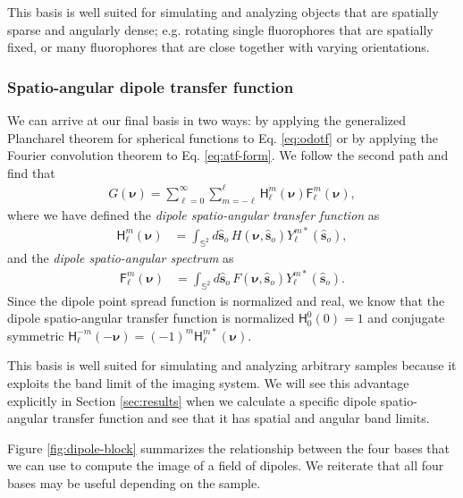 \documentclass[]{osa-article}
\providecommand{\msf}[1]{\mathsf{#1}}
\providecommand{\so}{\mathbf{\hat{s}}_o}
\providecommand{\mbb}[1]{\mathbb{#1}}
\providecommand{\bs}[1]{\boldsymbol{#1}}
\providecommand{\bv}{\bs{\nu}}
\providecommand{\lmsum}{\sum_{\ell=0}^\infty\sum_{m=-\ell}^{\ell}}
\begin{document}
This basis is well suited for simulating and analyzing objects that are
spatially sparse and angularly dense; e.g. rotating single fluorophores that are
spatially fixed, or many fluorophores that are close together with varying
orientations.

\subsubsection{Spatio-angular dipole transfer function}
We can arrive at our final basis in two ways: by applying the generalized
Plancharel theorem for spherical functions to Eq. \ref{eq:odotf} or by applying
the Fourier convolution theorem to Eq. \ref{eq:atf-form}. We follow the
second path and find that
\begin{align}
G(\bv) = \lmsum \msf{H}_\ell^m(\bv)\msf{F}_\ell^m(\bv) \label{eq:saft},
\end{align}
where we have defined the \textit{dipole spatio-angular transfer function} as
  \begin{align}
  \msf{H}_\ell^m(\bv) &= \int_{\mbb{S}^2}d\so\, H(\bv, \so)Y_\ell^{m*}(\so),
  \end{align}
  and the \textit{dipole spatio-angular spectrum} as
  \begin{align}
  \msf{F}_\ell^m(\bv) &= \int_{\mbb{S}^2}d\so\, F(\bv, \so)Y_\ell^{m*}(\so).
  \end{align}
  Since the dipole point spread function is normalized and real, we know
  that the dipole spatio-angular transfer function is normalized
  $\msf{H}_0^0(0) = 1$ and conjugate symmetric
  $\msf{H}_\ell^{-m}(-\bv) = (-1)^m\msf{H}_\ell^{m*}(\bv)$.
  
  This basis is well suited for simulating and analyzing arbitrary samples
  because it exploits the band limit of the imaging system. We will see this
  advantage explicitly in Section \ref{sec:results} when we calculate a specific
  dipole spatio-angular transfer function and see that it has spatial and
  angular band limits.

  Figure \ref{fig:dipole-block} summarizes the relationship between the four
  bases that we can use to compute the image of a field of dipoles. We reiterate
  that all four bases may be useful depending on the sample.
    
\end{document}
